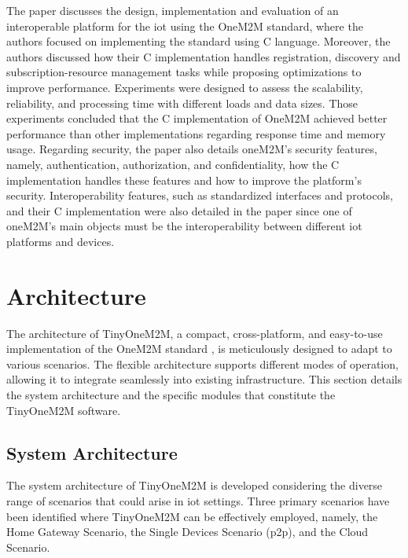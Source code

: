\documentclass[a4paper,fleqn]{cas-dc}
\begin{document}
The paper \cite{Kim2018} discusses the design, implementation and evaluation of an interoperable platform for the \gls{iot} using the OneM2M standard, where the authors focused on implementing the standard using C language. Moreover, the authors discussed how their C implementation handles registration, discovery and subscription-resource management tasks while proposing optimizations to improve performance. Experiments were designed to assess the scalability, reliability, and processing time with different loads and data sizes. Those experiments concluded that the C implementation of OneM2M achieved better performance than other implementations regarding response time and memory usage. Regarding security, the paper also details oneM2M's security features, namely, authentication, authorization, and confidentiality, how the C implementation handles these features and how to improve the platform's security. Interoperability features, such as standardized interfaces and protocols, and their C implementation were also detailed in the paper since one of oneM2M's main objects must be the interoperability between different \gls{iot} platforms and devices.


\section{Architecture}
\label{architecture}

The architecture of TinyOneM2M, a compact, cross-plat\-form, and easy-to-use implementation of the OneM2M standard \cite{onem2m_standard}, is meticulously designed to adapt to various scenarios. The flexible architecture supports different modes of operation, allowing it to integrate seamlessly into existing infrastructure. This section details the system architecture and the specific modules that constitute the TinyOneM2M software.

\subsection{System Architecture}

The system architecture of TinyOneM2M is developed considering the diverse range of scenarios that could arise in \gls{iot} settings. Three primary scenarios have been identified where TinyOneM2M can be effectively employed, namely, the Home Gateway Scenario, the Single Devices Scenario (\gls{p2p}), and the Cloud Scenario.
\end{document}
